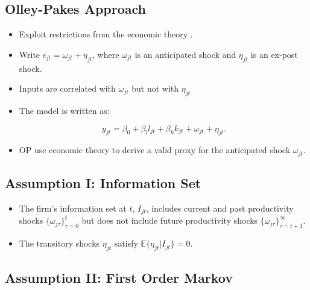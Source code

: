 \documentclass[]{book}
\providecommand{\tightlist}{%
  \setlength{\itemsep}{0pt}\setlength{\parskip}{0pt}}
\theoremstyle{definition}
\theoremstyle{definition}
\theoremstyle{definition}
\theoremstyle{remark}
\begin{document}
\subsection{Olley-Pakes Approach}\label{olley-pakes-approach}

\begin{itemize}
\tightlist
\item
  Exploit restrictions from the economic theory \citep{Olley1996}.
\item
  Write \(\epsilon_{jt} = \omega_{jt} + \eta_{jt}\), where
  \(\omega_{jt}\) is an anticipated shock and \(\eta_{jt}\) is an
  ex-post shock.
\item
  Inputs are correlated with \(\omega_{jt}\) but not with \(\eta_{jt}\)
\item
  The model is written as:

  \begin{equation}
  y_{jt} = \beta_0 + \beta_l l_{jt} + \beta_k k_{jt} + \omega_{jt} + \eta_{jt}.
  \end{equation}
\item
  OP use economic theory to derive a valid proxy for the anticipated
  shock \(\omega_{jt}\).
\end{itemize}

\subsection{Assumption I: Information
Set}\label{assumption-i-information-set}

\begin{itemize}
\tightlist
\item
  The firm's information set at \(t\), \(I_{jt}\), includes current and
  past productivity shocks \(\{\omega_{j\tau}\}_{\tau = 0}^t\) but does
  not include future productivity shocks
  \(\{\omega_{j\tau}\}_{\tau = t + 1}^{\infty}\).
\item
  The transitory shocks \(\eta_{jt}\) satisfy
  \(\mathbb{E}\{\eta_{jt}|I_{jt}\} = 0\).
\end{itemize}

\subsection{Assumption II: First Order
Markov}\label{assumption-ii-first-order-markov}
\end{document}
